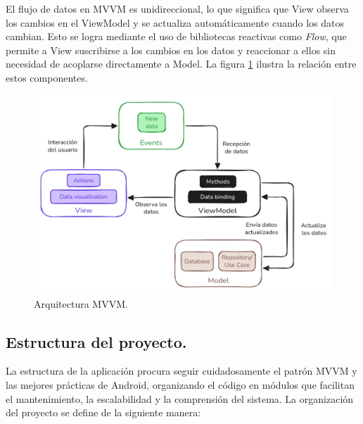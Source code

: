 \pagebreak

El flujo de datos en MVVM es unidireccional, lo que significa que View observa los cambios en el ViewModel y se actualiza automáticamente cuando los datos cambian. Esto se logra mediante el uso de bibliotecas reactivas como \textit{Flow}, que permite a View suscribirse a los cambios en los datos y reaccionar a ellos sin necesidad de acoplarse directamente a Model. La figura \ref{fig:arquitectura_mvvm} ilustra la relación entre estos componentes.

\begin{figure}[ht]
  \caption{Arquitectura MVVM.}
  \label{fig:arquitectura_mvvm}
  \includegraphics[width=\textwidth]{Figuras/arquitectura_mvvm.png}
  \centering
\end{figure}

\pagebreak

\subsection{Estructura del proyecto.}

La estructura de la aplicación procura seguir cuidadosamente el patrón MVVM y las mejores prácticas de Android, organizando el código en módulos que facilitan el mantenimiento, la escalabilidad y la comprensión del sistema. La organización del proyecto se define de la siguiente manera:


